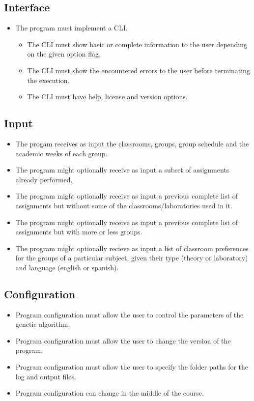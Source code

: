 \subsection{Interface}

\begin{itemize}
    \item The program must implement a CLI.
        \begin{itemize}
            \item The CLI must show basic or complete information to the user depending on the given option flag.
            \item The CLI must show the encountered errors to the user before terminating the execution.
            \item The CLI must have help, license and version options.
        \end{itemize}
\end{itemize}

\subsection{Input}

\begin{itemize}
    \item The progam receives as input the classrooms, groups, group schedule and the academic weeks of each group.
    \item The program might optionally receive as input a subset of assignments already performed.
    \item The program might optionally receive as input a previous complete list of assignments but without some of the classrooms/laboratories used in it.
    \item The program might optionally receive as input a previous complete list of assignments but with more or less groups.
    \item The program might optionally recieve as input a list of classroom preferences for the groups of a particular subject, given their type (theory or laboratory) and language (english or spanish).
\end{itemize}

\subsection{Configuration}

\begin{itemize}
    \item Program configuration must allow the user to control the parameters of the genetic algorithm.
    \item Program configuration must allow the user to change the version of the program.
    \item Program configuration must allow the user to specify the folder paths for the log and output files.
    \item Program configuration can change in the middle of the course.
\end{itemize}

